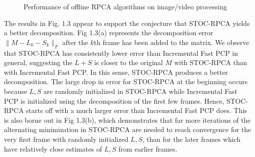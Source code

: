 \documentclass[oneside]{article}
\begin{document}
\begin{figure}[ht]
\centering
{}
\caption[]{Performance of offline RPCA algorithms on image/video processing}
\label{fig:subfigureExample3}
\end{figure}
\clearpage
The results in Fig. 1.3 appear to support the conjecture that STOC-RPCA yields a better decomposition. Fig 1.3(a) represents the decomposition error $\lVert M-L_{k}-S_{k}\rVert_{F}$ after the $k$th frame has been added to the matrix. We observe that STOC-RPCA has consistently lower error than Incremental Fast PCP in general, suggesting the $L+S$ is closer to the original $M$ with STOC-RPCA than with Incremental Fast PCP. In this sense, STOC-RPCA produces a better decomposition. The large drop in error for STOC-RPCA at the beginning occurs because $L, S$ are randomly initialized in STOC-RPCA while Incremental Fast PCP is initialized using the decomposition of the first few frames. Hence, STOC-RPCA starts off with a much larger error than Incremental Fast PCP does. This is also borne out in Fig 1.3(b), which demonstrates that far more iterations of the alternating minimization in STOC-RPCA are needed to reach convergence for the very first frame with randomly initialized $L, S$, than for the later frames which have relatively close estimates of $L,S$ from earlier frames.\newline\newline
\end{document}

